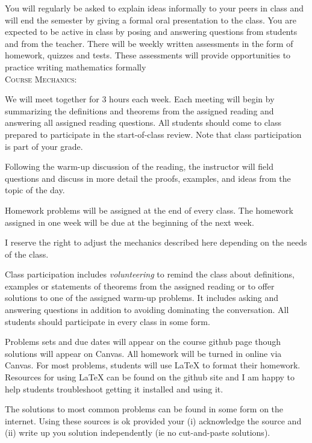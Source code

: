 \documentclass[11pt]{article}
\begin{document}
You will regularly be asked to explain ideas informally to your peers in class and will end the semester by giving a formal oral presentation to the class. You are expected to be active in class by posing and answering questions from students and from the teacher.  There will be weekly written assessments in the form of homework, quizzes and tests. These assessments will provide opportunities to practice writing mathematics formally\\

{\textsc{Course Mechanics}:}

We will meet together for 3 hours each week. Each meeting will begin by summarizing the definitions and theorems from the assigned reading and answering all assigned reading questions. All students should come to class prepared to participate in the start-of-class review. Note that class participation is part of your grade.

Following the warm-up discussion of the reading, the instructor will field questions and discuss in more detail the proofs, examples, and ideas from the topic of the day. 

Homework problems will be assigned at the end of every class. The homework assigned in one week will be due at the beginning of the next week.

I reserve the right to adjust the mechanics described here depending on the needs of the
class.\\

{}

Class participation includes \emph{volunteering} to remind the class about definitions, examples or statements of theorems from the assigned reading or to offer solutions to one of the assigned warm-up problems. It includes asking and answering questions in addition to avoiding dominating the conversation. All students should participate in every class in some form.\\

{}

Problems sets and due dates will appear on the course github page though solutions will appear on Canvas. All homework will be turned in online via Canvas. For most problems, students will use \LaTeX \: to format their homework.  Resources for using \LaTeX \: can be found on the github site and I am happy to help students troubleshoot getting it installed and using it.

The solutions to most common problems can be found in some form on the internet. Using these sources is ok provided your (i) acknowledge the source and (ii) write up you solution independently (ie no cut-and-paste solutions). 
\end{document}
